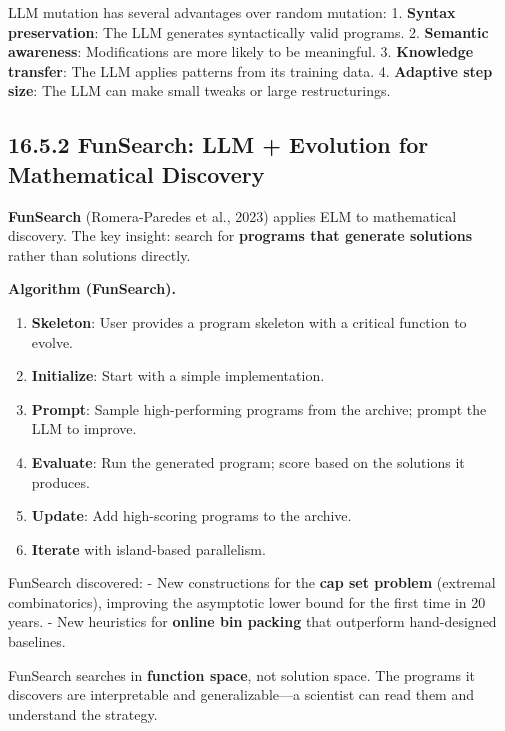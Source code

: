\begin{proposition}
LLM mutation has several advantages over random mutation:
1. \textbf{Syntax preservation}: The LLM generates syntactically valid programs.
2. \textbf{Semantic awareness}: Modifications are more likely to be meaningful.
3. \textbf{Knowledge transfer}: The LLM applies patterns from its training data.
4. \textbf{Adaptive step size}: The LLM can make small tweaks or large restructurings.
\end{proposition}

\subsection{16.5.2 FunSearch: LLM + Evolution for Mathematical Discovery}

\textbf{FunSearch} (Romera-Paredes et al., 2023) applies ELM to mathematical discovery. The key insight: search for \textbf{programs that generate solutions} rather than solutions directly.

\textbf{Algorithm (FunSearch).}
\begin{enumerate}
\item \textbf{Skeleton}: User provides a program skeleton with a critical function to evolve.
\item \textbf{Initialize}: Start with a simple implementation.
\item \textbf{Prompt}: Sample high-performing programs from the archive; prompt the LLM to improve.
\item \textbf{Evaluate}: Run the generated program; score based on the solutions it produces.
\item \textbf{Update}: Add high-scoring programs to the archive.
\item \textbf{Iterate} with island-based parallelism.
\end{enumerate}

\begin{theorem}
FunSearch discovered:
- New constructions for the \textbf{cap set problem} (extremal combinatorics), improving the asymptotic lower bound for the first time in 20 years.
- New heuristics for \textbf{online bin packing} that outperform hand-designed baselines.
\end{theorem}

\begin{remark}
FunSearch searches in \textbf{function space}, not solution space. The programs it discovers are interpretable and generalizable---a scientist can read them and understand the strategy.
\end{remark}

